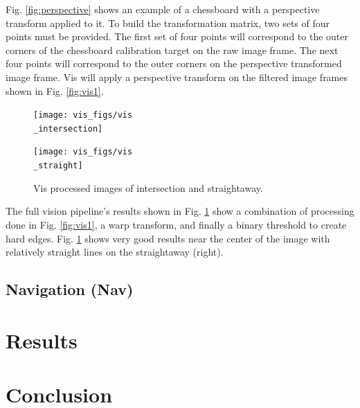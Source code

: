 \documentclass{article}
\begin{document}
Fig. \ref{fig:perspective} shows an example of a chessboard with a perspective transform applied to it. To build the transformation matrix, two sets of four
points must be provided. The first set of four points will correspond to the outer corners of the chessboard calibration target on the raw image frame. The next four points will correspond to the outer corners on the perspective transformed image frame. Vis will apply a perspective transform on the filtered image frames shown in Fig. \ref{fig:vis1}.

\begin{figure}[htb]
	\begin{minipage}[b]{.48\linewidth}
		\centering
		\centerline{\texttt{[image: vis\_figs/vis\\\_intersection]}}
	\end{minipage}
	\hfill
	\begin{minipage}[b]{0.48\linewidth}
		\centering
		\centerline{\texttt{[image: vis\_figs/vis\\\_straight]}}
	\end{minipage}
	\caption{Vis processed images of intersection and straightaway.}
	\label{fig:vis2}
\end{figure}

The full vision pipeline's results shown in Fig. \ref{fig:vis2} show a combination of processing done in Fig. \ref{fig:vis1}, a warp transform, and finally a binary threshold to create hard edges. Fig. \ref{fig:vis2} shows very good results near the center of the image with relatively straight lines on the straightaway (right). 

\subsection{Navigation (Nav)}

\section{Results}
\section{Conclusion}
\end{document}
